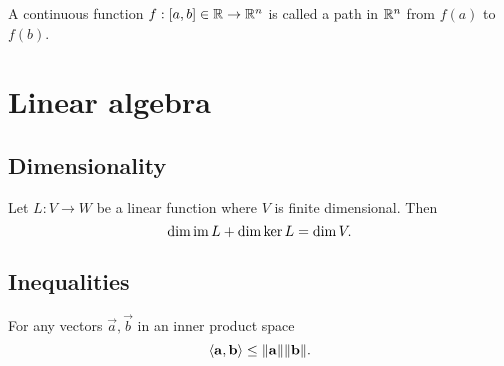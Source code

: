 \documentclass{article}
\begin{document}
\begin{definition}[Path]
    A continuous function $f: [a, b] \in \mathbb{R} \rightarrow \mathbb{R}^n$ is called a
    path in $\mathbb{R}^n$ from $f(a)$ to $f(b)$.
\end{definition}

\section{Linear algebra}

\subsection{Dimensionality}
\begin{theorem}
    Let $L: V \rightarrow W$ be a linear function
    where $V$ is finite dimensional. Then
    \begin{equation}
        \dim \operatorname{im} L + \dim \ker L = \dim V.
    \end{equation}
\end{theorem}
\subsection{Inequalities}


\begin{theorem}
    For any vectors $\vec{a}, \vec{b}$ in an inner product space
    \begin{equation}
        \langle\mathbf{a}, \mathbf{b}\rangle \leq \lVert\mathbf{a}\rVert \lVert\mathbf{b}\rVert.
    \end{equation}
\end{theorem}
\end{document}
